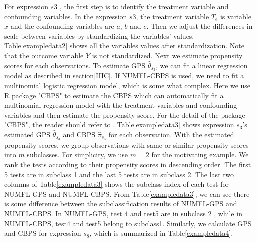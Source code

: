 For expression $s3$ , the first step is to identify the treatment variable and confounding variables. In the expression $s3$, the treatment variable $T_e$ is variable $x$ and the confounding variables are $a$, $b$ and $c$. Then we adjust  the differences in scale between variables by standardizing the variables' values. Table\ref{exampledata2} shows all the variables values after standardization. Note that the outcome variable $Y$ is not standardized. Next we estimate propensity scores for each observations. To estimate GPS ${\hat{\theta}}_{s_3}$, we can fit a linear regression model as described in section\ref{IIIC}. If NUMFL-CBPS is used, we need to fit a multinomial logistic regression model, which is some what complex. Here we use R package "CBPS" to estimate the CBPS which can automatically fit a multinomial regression model with the treatment variables and confounding variables and then estimate the propensity score. For the detail of the package "CBPS", the reader should refer to \cite{CBPS}. Table\ref{exampledata3} shows expression $s_3$'s  estimated GPS ${\hat{\theta}}_{s_3}$ and CBPS ${\hat{\pi}}_{s_3}$ for each observation. With the estimated propensity scores, we group observations with same or similar propensity scores into $m$ subclasses. For simplicity, we use $m=2$ for the motivating example. We rank the tests according to their propensity scores in descending order. The first 5 tests are in subclass 1 and the last 5 tests are in subclass 2. The last two columns of Table\ref{exampledata3} shows the subclass index of each test for NUMFL-GPS and NUMFL-CBPS. From Table\ref{exampledata3}, we can see there is some difference between the subclassification results of NUMFL-GPS and NUMFL-CBPS. In NUMFL-GPS, test 4 and test5 are in subclass 2 , while in NUMFL-CBPS, test4 and test5 belong to subclass1.  Similarly, we calculate GPS and CBPS for expression $s_8$, which is summarized in Table\ref{exampledata4}.  

